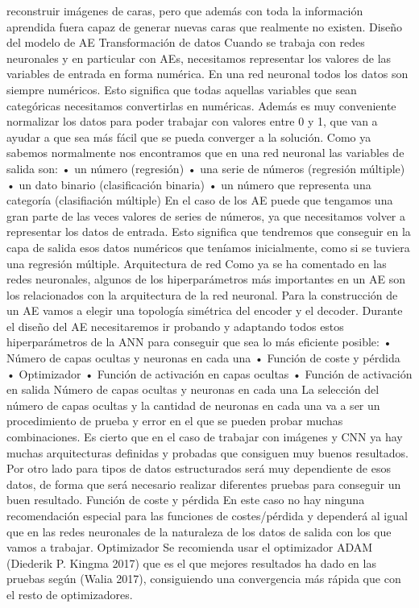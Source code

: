 \documentclass[
  a4paper,
  DIV=11,
  numbers=noendperiod]{scrreprt}
\begin{document}
reconstruir imágenes de caras, pero que además con toda la información
aprendida fuera capaz de generar nuevas caras que realmente no existen.
Diseño del modelo de AE Transformación de datos Cuando se trabaja con
redes neuronales y en particular con AEs, necesitamos representar los
valores de las variables de entrada en forma numérica. En una red
neuronal todos los datos son siempre numéricos. Esto significa que todas
aquellas variables que sean categóricas necesitamos convertirlas en
numéricas. Además es muy conveniente normalizar los datos para poder
trabajar con valores entre 0 y 1, que van a ayudar a que sea más fácil
que se pueda converger a la solución. Como ya sabemos normalmente nos
encontramos que en una red neuronal las variables de salida son: • un
número (regresión) • una serie de números (regresión múltiple) • un dato
binario (clasificación binaria) • un número que representa una categoría
(clasifiación múltiple) En el caso de los AE puede que tengamos una gran
parte de las veces valores de series de números, ya que necesitamos
volver a representar los datos de entrada. Esto significa que tendremos
que conseguir en la capa de salida esos datos numéricos que teníamos
inicialmente, como si se tuviera una regresión múltiple. Arquitectura de
red Como ya se ha comentado en las redes neuronales, algunos de los
hiperparámetros más importantes en un AE son los relacionados con la
arquitectura de la red neuronal. Para la construcción de un AE vamos a
elegir una topología simétrica del encoder y el decoder. Durante el
diseño del AE necesitaremos ir probando y adaptando todos estos
hiperparámetros de la ANN para conseguir que sea lo más eficiente
posible: • Número de capas ocultas y neuronas en cada una • Función de
coste y pérdida • Optimizador • Función de activación en capas ocultas •
Función de activación en salida Número de capas ocultas y neuronas en
cada una La selección del número de capas ocultas y la cantidad de
neuronas en cada una va a ser un procedimiento de prueba y error en el
que se pueden probar muchas combinaciones. Es cierto que en el caso de
trabajar con imágenes y CNN ya hay muchas arquitecturas definidas y
probadas que consiguen muy buenos resultados. Por otro lado para tipos
de datos estructurados será muy dependiente de esos datos, de forma que
será necesario realizar diferentes pruebas para conseguir un buen
resultado. Función de coste y pérdida En este caso no hay ninguna
recomendación especial para las funciones de costes/pérdida y dependerá
al igual que en las redes neuronales de la naturaleza de los datos de
salida con los que vamos a trabajar. Optimizador Se recomienda usar el
optimizador ADAM (Diederik P. Kingma 2017) que es el que mejores
resultados ha dado en las pruebas según (Walia 2017), consiguiendo una
convergencia más rápida que con el resto de optimizadores.
\end{document}
